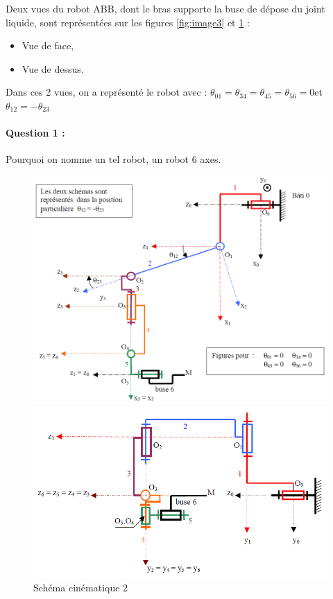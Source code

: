 Deux vues du robot ABB, dont le bras supporte la buse de dépose du joint liquide, sont représentées sur les figures \ref{fig:image3} et \ref{fig:image4} :
\begin{itemize}
 \item Vue de face,
 \item Vue de dessus.
\end{itemize}

Dans ces 2 vues, on a représenté le robot avec : $\theta_{01}=\theta_{34}=\theta_{45}=\theta_{56}=0$\textdegree et $\theta_{12}=-\theta_{23}$ 
\paragraph{Question 1 :} Pourquoi on nomme un tel robot, un robot 6 axes.


\begin{figure}[htbp]
\begin{minipage}[c]{.48\linewidth}
\begin{center}
\includegraphics[width=\linewidth]{img/Image5.png}
\caption{Schéma cinématique 1}
\label{fig:image3}
\end{center}
\end{minipage}
\hfill
\begin{minipage}[c]{.48\linewidth}
\begin{center}
\includegraphics[width=\linewidth]{img/Image6.png}
\caption{Schéma cinématique 2}
\label{fig:image4}
\end{center}
\end{minipage}
\end{figure}

